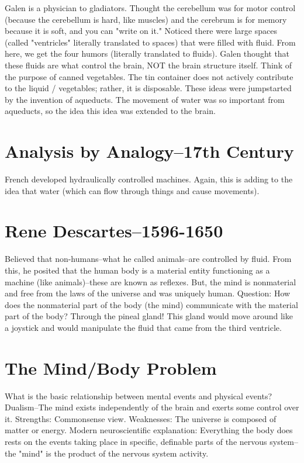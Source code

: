 Galen is a physician to gladiators. 
Thought the cerebellum was for motor control (because the cerebellum is hard, like muscles) and the cerebrum is for memory because it is soft, and you can "write on it."
Noticed there were large spaces (called "ventricles" literally translated to spaces) that were filled with fluid.
From here, we get the four humors (literally translated to fluids).
Galen thought that these fluids are what control the brain, NOT the brain structure itself. Think of the purpose of canned vegetables. The tin container does not actively contribute to the liquid / vegetables; rather, it is disposable.
These ideas were jumpstarted by the invention of aqueducts. The movement of water was so important from aqueducts, so the idea this idea was extended to the brain.

\section{Analysis by Analogy--17th Century}

French developed hydraulically controlled machines.
Again, this is adding to the idea that water (which can flow through things and cause movements).

\section{Rene Descartes--1596-1650}

Believed that non-humans--what he called animals--are controlled by fluid.
From this, he posited that the human body is a material entity functioning as a machine (like animals)--these are known as reflexes.
But, the mind is nonmaterial and free from the laws of the universe and was uniquely human.
Question: How does the nonmaterial part of the body (the mind) communicate with the material part of the body? Through the pineal gland! This gland would move around like a joystick and would manipulate the fluid that came from the third ventricle.

\section{The Mind/Body Problem}

What is the basic relationship between mental events and physical events?
Dualism--The mind exists independently of the brain and exerts some control over it.
	Strengths: Commonsense view.
	Weaknesses: The universe is composed of matter or energy.
Modern neuroscientific explanation: Everything the body does rests on the events taking place in specific, definable parts of the nervous system--the "mind" is the product of the nervous system activity.

